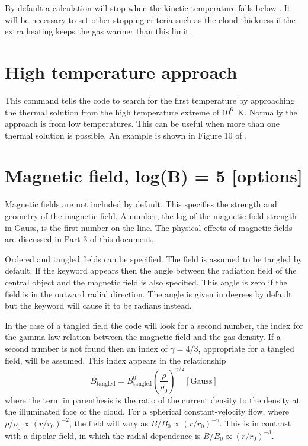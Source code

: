 By default a calculation will stop when the kinetic temperature falls
below \TEMPSTOPDEFAULT.  It will be necessary to set other stopping criteria such
as the cloud thickness if the extra heating keeps the gas warmer than this
limit.

\section{High temperature approach}

This command tells the code to search for the first temperature by
approaching the thermal solution from the high temperature extreme of $10^6$~K.
Normally the approach is from low temperatures.
This can be useful
when more than one thermal solution is possible.
An example is shown in Figure 10 of \citet{FerlandFabian2009}.

\section{Magnetic field, log(B) = 5 [options]}

Magnetic fields are not included by default.
This specifies the strength
and geometry of the magnetic field.
A number, the log of the magnetic field
strength in Gauss, is the first number on the line.
The physical effects
of magnetic fields are discussed in Part 3 of this document.

Ordered and tangled fields can be specified.
The field is assumed to
be tangled by default.
If the keyword  appears then the angle between
the radiation field of the central object and the magnetic field
is also specified.
This angle is zero if the field is in the outward radial
direction.
The angle is given in degrees by default but the
 keyword
will cause it to be radians instead.

In the case of a tangled field the code will look for a second number,
the index for the gamma-law relation between the magnetic field and the
gas density.
If a second number is not found then an index of $\gamma = 4/3$,
appropriate for a tangled field, will be assumed.
This index appears in the relationship
\begin{equation}
B_{{\mathrm{tangled}}}  = B_{{\mathrm{tangled}}}^0 \left( {\frac{\rho }{{\rho _0
}}} \right)^{\gamma /2}
 [\mathrm{Gauss}]
\end{equation}
where the term in parenthesis is the ratio of the current density to the
density at the illuminated face of the cloud.
For a spherical
constant-velocity flow, where ${\rho /\rho _0 }\propto(r/r_0 )^{-2} $, the
field will vary as  $B/B_0\propto( r/r_0 )^{-\gamma }$.
This is in contrast with a dipolar field,
in which the radial dependence
is $B/B_0 \propto( r /r_0 )^{-3}$.

